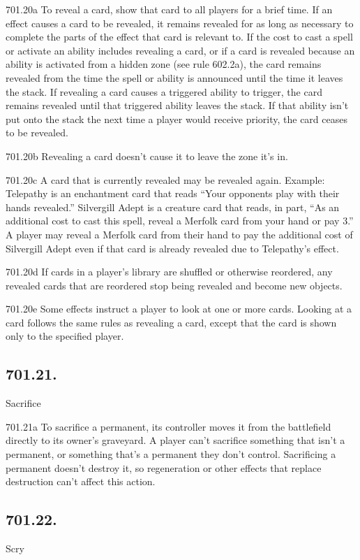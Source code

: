 701.20a To reveal a card, show that card to all players for a brief time. If an effect causes a card to be revealed, it remains revealed for as long as necessary to complete the parts of the effect that card is relevant to. If the cost to cast a spell or activate an ability includes revealing a card, or if a card is revealed because an ability is activated from a hidden zone (see rule 602.2a), the card remains revealed from the time the spell or ability is announced until the time it leaves the stack. If revealing a card causes a triggered ability to trigger, the card remains revealed until that triggered ability leaves the stack. If that ability isn’t put onto the stack the next time a player would receive priority, the card ceases to be revealed.

701.20b Revealing a card doesn’t cause it to leave the zone it’s in.

701.20c A card that is currently revealed may be revealed again.
Example: Telepathy is an enchantment card that reads “Your opponents play with their hands revealed.” Silvergill Adept is a creature card that reads, in part, “As an additional cost to cast this spell, reveal a Merfolk card from your hand or pay {3}.” A player may reveal a Merfolk card from their hand to pay the additional cost of Silvergill Adept even if that card is already revealed due to Telepathy’s effect.

701.20d If cards in a player’s library are shuffled or otherwise reordered, any revealed cards that are reordered stop being revealed and become new objects.

701.20e Some effects instruct a player to look at one or more cards. Looking at a card follows the same rules as revealing a card, except that the card is shown only to the specified player.

\subsection*{701.21.}
Sacrifice

701.21a To sacrifice a permanent, its controller moves it from the battlefield directly to its owner’s graveyard. A player can’t sacrifice something that isn’t a permanent, or something that’s a permanent they don’t control. Sacrificing a permanent doesn’t destroy it, so regeneration or other effects that replace destruction can’t affect this action.

\subsection*{701.22.}
Scry

